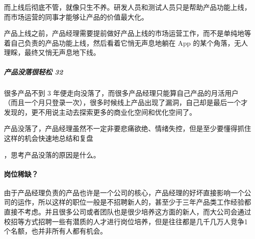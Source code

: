 \documentclass[letterpaper,10pt,english]{sphinxmanual}
\begin{document}
而上线后彻底不管，就像只生不养。研发人员和测试人员只是帮助产品功能上线，而市场运营的同事才能够让产品的价值最大化。

产品上线之前，产品经理需要提前做好产品上线的市场运营工作，而不是单纯地等着自己负责的产品功能上线，然后看着它悄无声息地躺在
App 的某个角落，无人理睬，最终又悄无声息地下线。


\subparagraph{产品没落很轻松 32\sphinxfootnotemark[179]}
\label{\detokenize{chapter_introduction/PM:id15}}%
\begin{footnotetext}[179]\sphinxAtStartFootnote
{}
%
\end{footnotetext}\ignorespaces 
很多产品不到 3
年便走向没落了，而很多产品经理只能算自己产品的月活用户（而且一个月只登录一次），很多时候线上产品出现了漏洞，自己却是最后一个才发现的，更不用说主动去探索更多的商业化空间和优化空间了。

产品没落了，产品经理虽然不一定非要悲痛欲绝、情绪失控，但是至少要懂得抓住这样的机会快速地总结和复盘%
\begin{footnote}[180]\sphinxAtStartFootnote
{}
%
\end{footnote}，思考产品没落的原因是什么。


\paragraph{岗位稀缺？}
\label{\detokenize{chapter_introduction/PM:id16}}
由于产品经理负责的产品也许是一个公司的核心，产品经理的好坏直接影响一个公司的运作，所以这样的职位一般是不招聘新人的，甚至少于三年产品类工作经验都直接不考虑。并且很多公司或者团队也是很少培养这方面的新人，而大公司会通过校招等方式招聘一些有潜质的人才进行岗位培养，但是往往都是几千几万人竞争1个名额，也并非所有人都有机会。
%
\begin{footnote}[181]\sphinxAtStartFootnote
{}
%
\end{footnote}
\end{document}
